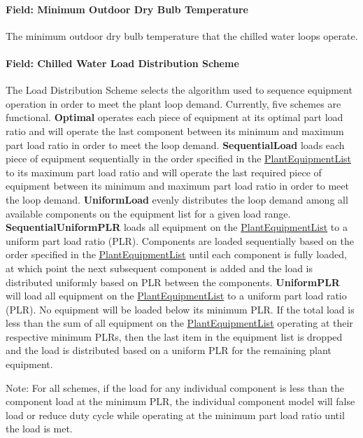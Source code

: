 \paragraph{Field: Minimum Outdoor Dry Bulb Temperature}\label{field-minimum-outdoor-dry-bulb-temperature}

The minimum outdoor dry bulb temperature that the chilled water loops operate.

\paragraph{Field: Chilled Water Load Distribution Scheme}\label{field-chilled-water-load-distribution-scheme}

The Load Distribution Scheme selects the algorithm used to sequence equipment operation in order to meet the plant loop demand. Currently, five schemes are functional. \textbf{Optimal} operates each piece of equipment at its optimal part load ratio and will operate the last component between its minimum and maximum part load ratio in order to meet the loop demand. \textbf{SequentialLoad} loads each piece of equipment sequentially in the order specified in the \hyperref[plantequipmentlist]{PlantEquipmentList} to its maximum part load ratio and will operate the last required piece of equipment between its minimum and maximum part load ratio in order to meet the loop demand. \textbf{UniformLoad} evenly distributes the loop demand among all available components on the equipment list for a given load range. \textbf{SequentialUniformPLR} loads all equipment on the \hyperref[plantequipmentlist]{PlantEquipmentList} to a uniform part load ratio (PLR). Components are loaded sequentially based on the order specified in the \hyperref[plantequipmentlist]{PlantEquipmentList} until each component is fully loaded, at which point the next subsequent component is added and the load is distributed uniformly based on PLR between the components. \textbf{UniformPLR} will load all equipment on the \hyperref[plantequipmentlist]{PlantEquipmentList} to a uniform part load ratio (PLR). No equipment will be loaded below its minimum PLR. If the total load is less than the sum of all equipment on the \hyperref[plantequipmentlist]{PlantEquipmentList} operating at their respective minimum PLRs, then the last item in the equipment list is dropped and the load is distributed based on a uniform PLR for the remaining plant equipment.

Note: For all schemes, if the load for any individual component is less than the component load at the minimum PLR, the individual component model will false load or reduce duty cycle while operating at the minimum part load ratio until the load is met.

